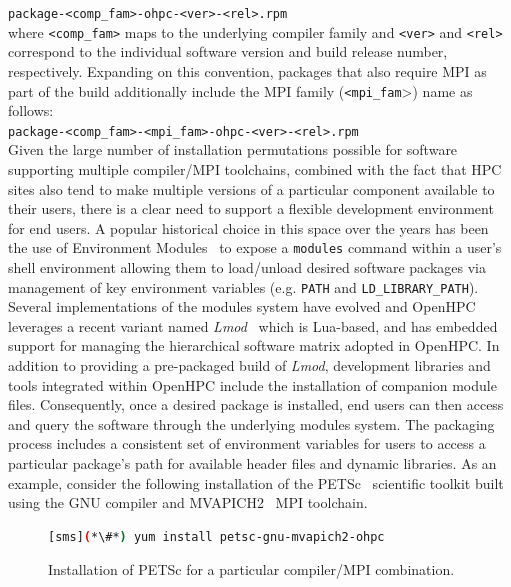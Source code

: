 \documentclass{sig-alternate-05-2015}
\begin{document}
\noindent
\texttt{package-<comp\_fam>-ohpc-<ver>-<rel>.rpm} \\

\noindent where \texttt{<comp\_fam>} maps to the underlying compiler family and \texttt{<ver>}
and \texttt{<rel>} correspond to the individual software version and build
release number, respectively.
Expanding on this convention, packages that also require MPI as part of the build
additionally include the MPI family (\texttt{<mpi\_fam}>) name as follows: \\

\noindent
\texttt{package-<comp\_fam>-<mpi\_fam>-ohpc-<ver>-<rel>.rpm} \\

\noindent
Given the large number of installation permutations possible for software
supporting multiple compiler/MPI toolchains, combined with the fact that HPC
sites also tend to make multiple versions of a particular component available
to their users, there is a clear need to support a flexible development environment for end
users. A popular historical choice in this space over the years has been the
use of Environment Modules~\cite{furlani_1996} to expose a \texttt{modules}
command within a user's shell environment allowing them to load/unload desired
software packages via management of key environment variables
(e.g. \texttt{{PATH}} and \texttt{{LD\_LIBRARY\_PATH}}). Several
implementations of the modules system have evolved and OpenHPC leverages a
recent variant named {\em Lmod}~\cite{tacc_sc_best_practices:2011,lmod_url}
which is Lua-based, and has embedded support for managing the
hierarchical software matrix adopted in OpenHPC.  In addition to providing a
pre-packaged build of {\em Lmod}, development libraries and tools integrated
within OpenHPC include the installation of companion module files.
Consequently, once a desired package is installed, end users can then access
and query the software through the underlying modules system. The packaging
process includes a consistent set of environment variables for users to
access a particular package's path for available header files and dynamic
libraries. As an example, consider the following installation of the
PETSc~\cite{PETSc_url} scientific toolkit built using the GNU compiler and
MVAPICH2~\cite{mvapich2} MPI toolchain.

\begin{figure}[h]
\begin{lstlisting}[language=bash,keywords={}]
[sms](*\#*) yum install petsc-gnu-mvapich2-ohpc
\end{lstlisting}
\vspace*{-0.3cm}
  \caption{Installation of PETSc for a particular compiler/MPI combination.}
    \label{fig:petscinstall}
\end{figure}
\end{document}
